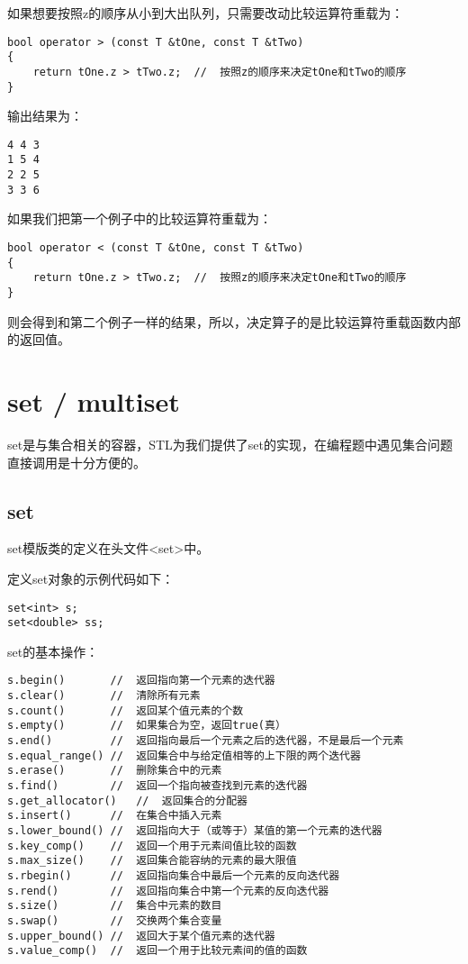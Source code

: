 如果想要按照z的顺序从小到大出队列，只需要改动比较运算符重载为：
\begin{lstlisting}
bool operator > (const T &tOne, const T &tTwo)
{
    return tOne.z > tTwo.z;  //  按照z的顺序来决定tOne和tTwo的顺序
}
\end{lstlisting}

输出结果为：
\begin{lstlisting} 
4 4 3 
1 5 4 
2 2 5 
3 3 6 
\end{lstlisting}

如果我们把第一个例子中的比较运算符重载为：
\begin{lstlisting}
bool operator < (const T &tOne, const T &tTwo)
{
    return tOne.z > tTwo.z;  //  按照z的顺序来决定tOne和tTwo的顺序
}
\end{lstlisting}
则会得到和第二个例子一样的结果，所以，决定算子的是比较运算符重载函数内部的返回值。


\section{set / multiset}
set是与集合相关的容器，STL为我们提供了set的实现，在编程题中遇见集合问题直接调用是十分方便的。

\subsection{set}

set模版类的定义在头文件<set>中。

定义set对象的示例代码如下：
\begin{lstlisting}
set<int> s;
set<double> ss;
\end{lstlisting}

set的基本操作：

\begin{lstlisting}
s.begin()       //  返回指向第一个元素的迭代器
s.clear()       //  清除所有元素
s.count()       //  返回某个值元素的个数
s.empty()       //  如果集合为空，返回true(真）
s.end()         //  返回指向最后一个元素之后的迭代器，不是最后一个元素
s.equal_range() //  返回集合中与给定值相等的上下限的两个迭代器
s.erase()       //  删除集合中的元素
s.find()        //  返回一个指向被查找到元素的迭代器
s.get_allocator()   //  返回集合的分配器
s.insert()      //  在集合中插入元素
s.lower_bound() //  返回指向大于（或等于）某值的第一个元素的迭代器
s.key_comp()    //  返回一个用于元素间值比较的函数
s.max_size()    //  返回集合能容纳的元素的最大限值
s.rbegin()      //  返回指向集合中最后一个元素的反向迭代器
s.rend()        //  返回指向集合中第一个元素的反向迭代器
s.size()        //  集合中元素的数目
s.swap()        //  交换两个集合变量
s.upper_bound() //  返回大于某个值元素的迭代器
s.value_comp()  //  返回一个用于比较元素间的值的函数
\end{lstlisting}

